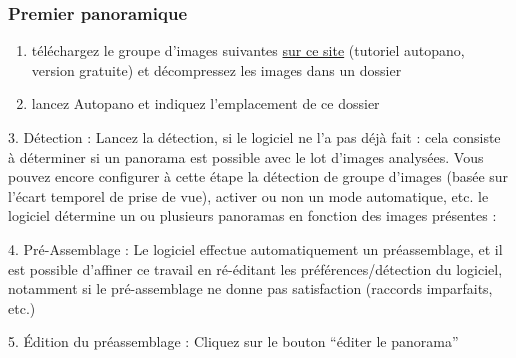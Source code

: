 \documentclass[a4paper,12pt,french]{sphinxmanual}
\begin{document}
\subsubsection{Premier panoramique}
\label{psd/scan+assemblage_psd+gimp+autopano:premier-panoramique}\begin{enumerate}
\item {} 
téléchargez le groupe d'images suivantes \href{http://autopano.kolor.com/sample\_pictures.zip}{sur ce site} (tutoriel autopano, version gratuite) et décompressez les images dans un dossier

\item {} 
lancez Autopano et indiquez l'emplacement de ce dossier

\end{enumerate}

3. Détection :
Lancez la détection, si le logiciel ne l'a pas déjà fait : cela consiste à déterminer si un panorama est possible avec le lot d'images analysées. Vous pouvez encore configurer à cette étape la détection de groupe d'images (basée sur l'écart temporel de prise de vue), activer ou non un mode automatique, etc.
le logiciel détermine un ou plusieurs panoramas en fonction des images présentes :


4. Pré-Assemblage :
Le logiciel effectue automatiquement un préassemblage, et il est possible d'affiner ce travail en ré-éditant les préférences/détection du logiciel, notamment si le pré-assemblage ne donne pas satisfaction (raccords imparfaits, etc.)

5. Édition du préassemblage :
Cliquez sur le bouton ``éditer le panorama'' 
\end{document}
